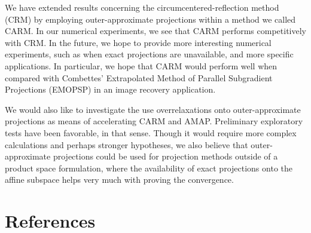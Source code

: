 \documentclass[smallextended,numbook,nospthms]{svjour3}
\theoremstyle{plain}
\theoremstyle{definition}
\begin{document}
We have extended results concerning the circumcentered-reflection method (CRM) by employing outer-approximate projections within a method we called CARM. In our numerical experiments, we see that CARM performs competitively with CRM. In the future, we hope to provide more interesting numerical experiments, such as when exact projections are unavailable, and more specific applications. In particular, we hope that CARM would perform well when compared with Combettes' Extrapolated Method of Parallel Subgradient Projections (EMOPSP) \cite{Combettes:1996} in an image recovery application.

We would also like to investigate the use overrelaxations onto outer-approximate projections as means of accelerating CARM and AMAP. Preliminary exploratory tests have been favorable, in that sense. Though it would require more complex calculations and perhaps stronger hypotheses, we also believe that outer-approximate projections could be used for projection methods outside of a product space formulation, where the availability of exact projections onto the affine subspace helps very much with proving the convergence.

\newpage
\section{References}




\newpage
\end{document}
